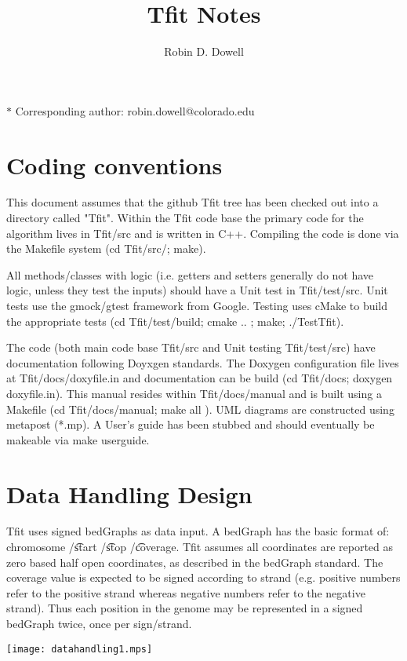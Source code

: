 \documentclass[11pt]{article}
\title{Tfit Notes}
\author{Robin D. Dowell}
\date{}
\date{ }
\begin{document}
\maketitle
\noindent $*$ Corresponding author: robin.dowell@colorado.edu

\section{Coding conventions}
This document assumes that the github Tfit tree has been checked out into a 
directory called "Tfit".   Within the Tfit code base the primary code for the 
algorithm lives in Tfit/src and is written in C++.   Compiling the code is 
done via the Makefile system (cd Tfit/src/; make). 

All methods/classes with logic (i.e. getters and setters generally do not 
have logic, unless they test the inputs) should have a Unit test in 
Tfit/test/src.  Unit tests use the gmock/gtest framework from Google.   
Testing uses cMake to build the appropriate tests (cd Tfit/test/build; 
    cmake .. ; make; ./TestTfit).  

The code (both main code base Tfit/src and Unit testing Tfit/test/src) have
documentation following Doyxgen standards.   The Doxygen configuration file
lives at Tfit/docs/doxyfile.in and documentation can be build (cd Tfit/docs; 
    doxygen doxyfile.in).   This manual resides within Tfit/docs/manual and 
is built using a Makefile (cd Tfit/docs/manual; make all ).  UML diagrams are
constructed using metapost (*.mp).  A User's guide has been stubbed and should
eventually be makeable via make userguide.

\section{Data Handling Design}
Tfit uses signed bedGraphs as data input.  A bedGraph has the basic format of: 
chromosome /\t start /\t stop /\t coverage.  Tfit assumes all coordinates are
reported as zero based half open coordinates, as described in the bedGraph standard.  
The coverage value is expected to be signed according to strand (e.g. positive 
numbers refer to the positive strand whereas negative numbers refer to the 
negative strand).  Thus each position in the genome may be represented in a 
signed bedGraph twice, once per sign/strand.

\texttt{[image: datahandling1.mps]}
\end{document}
